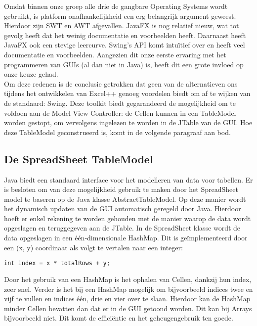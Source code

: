 \documentclass[a4paper,11pt]{article}
\begin{document}
\newpage Omdat binnen onze groep alle drie de gangbare Operating Systems wordt gebruikt, is platform onafhankelijkheid een erg belangrijk argument geweest. Hierdoor zijn SWT en AWT afgevallen. JavaFX is nog relatief nieuw, wat tot gevolg heeft dat het weinig documentatie en voorbeelden heeft. Daarnaast heeft JavaFX ook een stevige leercurve. Swing's API komt intuïtief over en heeft veel documentatie en voorbeelden. Aangezien dit onze eerste ervaring met het programmeren van GUIs (al dan niet in Java) is, heeft dit een grote invloed op onze keuze gehad.\\

Om deze redenen is de conclusie getrokken dat geen van de alternatieven ons tijdens het ontwikkelen van Excel++ genoeg voordelen biedt om af te wijken van de standaard: Swing. Deze toolkit biedt gegarandeerd de mogelijkheid om te voldoen aan de Model View Controller: de Cellen kunnen in een TableModel worden gestopt, om vervolgens ingelezen te worden in de JTable van de GUI. Hoe deze TableModel geconstrueerd is, komt in de volgende paragraaf aan bod.\\

\subsection{De SpreadSheet TableModel}
Java biedt een standaard interface voor het modelleren van data voor tabellen. Er is besloten om van deze mogelijkheid gebruik te maken door het SpreadSheet model te baseren op de Java klasse AbstractTableModel. Op deze manier wordt het dynamisch updaten van de GUI automatisch geregeld door Java. Hierdoor hoeft er enkel rekening te worden gehouden met de manier waarop de data wordt opgeslagen en teruggegeven aan de JTable. In de SpreadSheet klasse wordt de data opgeslagen in een één-dimensionale HashMap. Dit is geïmplementeerd door een (x, y) coordinaat als volgt te vertalen naar een integer:
\begin{verbatim}
int index = x * totalRows + y;
\end{verbatim}

Door het gebruik van een HashMap is het ophalen van Cellen, dankzij hun index, zeer snel. Verder is het bij een HashMap mogelijk om bijvoorbeeld indices twee en vijf te vullen en indices één, drie en vier over te slaan. Hierdoor kan de HashMap minder Cellen bevatten dan dat er in de GUI getoond worden. Dit kan bij Arrays bijvoorbeeld niet. Dit komt de efficiëntie en het geheugengebruik ten goede.
\end{document}
